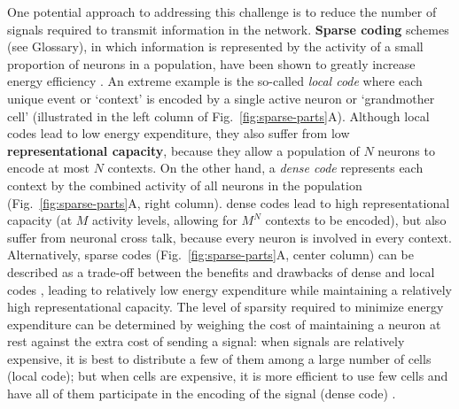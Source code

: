 One potential approach to addressing this challenge is to
reduce the number of signals required to transmit information in the network.
\textbf{Sparse coding} schemes (see Glossary),
in which information is represented by the activity of a small
proportion of neurons in a population,
have been shown to greatly increase energy efficiency 
\cite{Foldiak1990,Field1994,LevyBaxter1996}.
An extreme example is the so-called \emph{local code}
where each unique event or `context' is encoded by a single active neuron
or `grandmother cell' \cite{RollsTreves1990}
(illustrated in the left column of Fig.~\ref{fig:sparse-parts}A).
Although local codes lead to low energy expenditure, 
they also suffer from low \textbf{representational capacity},
because they allow a population of $N$ neurons to encode at most $N$ contexts.
On the other hand, a \emph{dense code}
represents each context by the combined activity
of all neurons in the population
(Fig.~\ref{fig:sparse-parts}A, right column).
dense codes lead to high representational capacity
(at $M$ activity levels, allowing for $M^N$ contexts to be encoded),
but also suffer from neuronal cross talk,
because every neuron is involved in every context.
Alternatively, sparse codes
(Fig.~\ref{fig:sparse-parts}A, center column)
can be described as a trade-off between the benefits and
drawbacks of dense and local codes 
\cite{SpanneJorntell2015,Foldiak1990},
leading to relatively low energy expenditure while maintaining a 
relatively high representational capacity.
The level of sparsity required to minimize energy expenditure can be determined
by weighing the cost of maintaining a neuron at rest against the extra cost
of sending a signal:
when signals are relatively expensive, it is best to distribute a few of them
among a large number of cells (local code); but
when cells are expensive, it is more efficient to use few cells
and have all of them participate in the encoding of the signal (dense code)
\cite{RollsTreves1990,Laughlin2001}.


